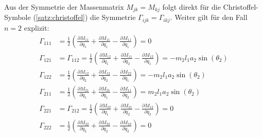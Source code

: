 \documentclass[a4paper, 12pt]{scrartcl}
\begin{document}
Aus der Symmetrie der Massenmatrix $M_{jk}=M_{kj}$ folgt direkt für die 
Christoffel-Symbole (\ref{satz:christoffel}) die Symmetrie $\Gamma_{ijk} = \Gamma_{ikj}$. 
Weiter gilt für den Fall $n=2$ explizit:
\begin{align*}
    \Gamma_{111} 
    &=
    \frac{1}{2} 
    \left(
        \frac{\partial M_{11}}{\partial q_1} 
        +
        \frac{\partial M_{11}}{\partial q_1} 
        -
        \frac{\partial M_{11}}{\partial q_1} 
    \right)
    =
    0
    \\
    \Gamma_{121}
    &= 
    \Gamma_{112}
    =
    \frac{1}{2} 
    \left(
        \frac{\partial M_{12}}{\partial q_1} 
        +
        \frac{\partial M_{11}}{\partial q_2} 
        -
        \frac{\partial M_{12}}{\partial q_1} 
    \right)
    =
    -m_2 l_1 a_2 \sin(\theta_2)
    \\
    \Gamma_{122} 
    &=
    \frac{1}{2} 
    \left(
        \frac{\partial M_{12}}{\partial q_2} 
        +
        \frac{\partial M_{12}}{\partial q_2} 
        -
        \frac{\partial M_{22}}{\partial q_1} 
    \right)
    =
    -m_2 l_1 a_2 \sin(\theta_2)
    \\
    \Gamma_{211} 
    &=
    \frac{1}{2} 
    \left(
        \frac{\partial M_{21}}{\partial q_1} 
        +
        \frac{\partial M_{21}}{\partial q_1} 
        -
        \frac{\partial M_{11}}{\partial q_2} 
    \right)
    =
    m_2 l_1 a_2 \sin(\theta_2)
    \\
    \Gamma_{221} 
    &=
    \Gamma_{212} 
    =
    \frac{1}{2} 
    \left(
        \frac{\partial M_{22}}{\partial q_1} 
        +
        \frac{\partial M_{21}}{\partial q_2} 
        -
        \frac{\partial M_{12}}{\partial q_2} 
    \right)
    =
    0
    \\
    \Gamma_{222} 
    &=
    \frac{1}{2} 
    \left(
        \frac{\partial M_{22}}{\partial q_2} 
        +
        \frac{\partial M_{22}}{\partial q_2} 
        -
        \frac{\partial M_{22}}{\partial q_2} 
    \right)
    =
    0 
\end{align*}
\end{document}
